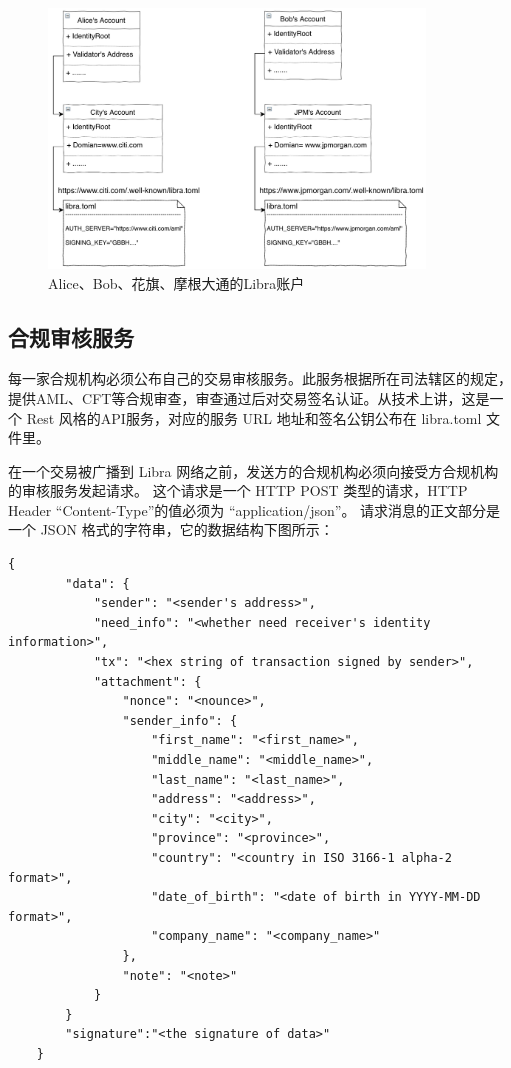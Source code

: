 \begin{figure}[h!]
    \centering
    \includegraphics[width=10cm, keepaspectratio]{images/alice_bob.png}
    \caption{Alice、Bob、花旗、摩根大通的Libra账户}
    \label{fig:accounts}
\end{figure}

\subsection{合规审核服务}
每一家合规机构必须公布自己的交易审核服务。此服务根据所在司法辖区的规定，提供AML、CFT等合规审查，审查通过后对交易签名认证。从技术上讲，这是一个 Rest 风格的API服务，对应的服务 URL 地址和签名公钥公布在 libra.toml 文件里。 


在一个交易被广播到 Libra 网络之前，发送方的合规机构必须向接受方合规机构的审核服务发起请求。
这个请求是一个 HTTP POST 类型的请求，HTTP Header “Content-Type”的值必须为 “application/json”。
请求消息的正文部分是一个 JSON 格式的字符串，它的数据结构下图所示：

\begin{lstlisting}[caption={审核服务请求}, label={lst:auth_request}]
    {
        "data": {
            "sender": "<sender's address>",
            "need_info": "<whether need receiver's identity information>",
            "tx": "<hex string of transaction signed by sender>",
            "attachment": {
                "nonce": "<nounce>",
                "sender_info": {
                    "first_name": "<first_name>",
                    "middle_name": "<middle_name>",
                    "last_name": "<last_name>",
                    "address": "<address>",
                    "city": "<city>",
                    "province": "<province>",
                    "country": "<country in ISO 3166-1 alpha-2 format>",
                    "date_of_birth": "<date of birth in YYYY-MM-DD format>",
                    "company_name": "<company_name>"
                },
                "note": "<note>"
            }
        }
        "signature":"<the signature of data>"
    }
\end{lstlisting}


